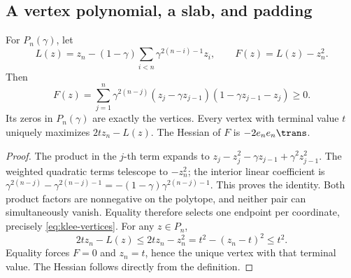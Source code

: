 \subsection{A vertex polynomial, a slab, and padding}
\begin{lemma}\label{lem:klee-telescope}
For \(P_n(\gamma)\), let
\[
 L(z)=z_n-(1-\gamma)\sum_{i<n}\gamma^{2(n-i)-1}z_i,
 \qquad F(z)=L(z)-z_n^2.
\]
Then
\begin{equation}\label{eq:klee-telescoping}
 F(z)=\sum_{j=1}^n\gamma^{2(n-j)}
   (z_j-\gamma z_{j-1})(1-\gamma z_{j-1}-z_j)\ge0.
\end{equation}
Its zeros in \(P_n(\gamma)\) are exactly the vertices. Every vertex with
terminal value \(t\) uniquely maximizes \(2tz_n-L(z)\). The Hessian of \(F\)
is \(-2e_ne_n\trans\).
\end{lemma}
\begin{proof}
The product in the \(j\)-th term expands to
\(z_j-z_j^2-\gamma z_{j-1}+\gamma^2z_{j-1}^2\).
The weighted quadratic terms telescope to \(-z_n^2\); the interior linear
coefficient is
\(\gamma^{2(n-j)}-\gamma^{2(n-j)-1}=-(1-\gamma)\gamma^{2(n-j)-1}\).
This proves the identity. Both product factors are nonnegative on the
polytope, and neither pair can simultaneously vanish. Equality therefore
selects one endpoint per coordinate, precisely \eqref{eq:klee-vertices}.
For any \(z\in P_n\),
\[
 2tz_n-L(z)\le2tz_n-z_n^2=t^2-(z_n-t)^2\le t^2.
\]
Equality forces \(F=0\) and \(z_n=t\), hence the unique vertex with that
terminal value. The Hessian follows directly from the definition.
\end{proof}


